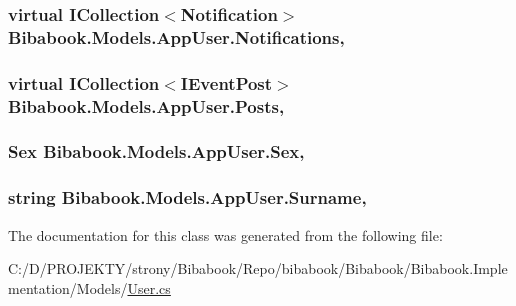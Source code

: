 \subsubsection[{Notifications}]{\setlength{\rightskip}{0pt plus 5cm}virtual I\+Collection$<${\bf Notification}$>$ Bibabook.\+Models.\+App\+User.\+Notifications\hspace{0.3cm}{\ttfamily [get]}, {\ttfamily [set]}}\label{class_bibabook_1_1_models_1_1_app_user_ae6b3d722c91df8dca88d2559d52ea6f4}
\hypertarget{class_bibabook_1_1_models_1_1_app_user_a84be3b79076df57e90c2f46086ba16d7}{}
\subsubsection[{Posts}]{\setlength{\rightskip}{0pt plus 5cm}virtual I\+Collection$<$I\+Event\+Post$>$ Bibabook.\+Models.\+App\+User.\+Posts\hspace{0.3cm}{\ttfamily [get]}, {\ttfamily [set]}}\label{class_bibabook_1_1_models_1_1_app_user_a84be3b79076df57e90c2f46086ba16d7}
\hypertarget{class_bibabook_1_1_models_1_1_app_user_a2130ea655fc647a8331fe0d17bc48808}{}
\subsubsection[{Sex}]{\setlength{\rightskip}{0pt plus 5cm}Sex Bibabook.\+Models.\+App\+User.\+Sex\hspace{0.3cm}{\ttfamily [get]}, {\ttfamily [set]}}\label{class_bibabook_1_1_models_1_1_app_user_a2130ea655fc647a8331fe0d17bc48808}
\hypertarget{class_bibabook_1_1_models_1_1_app_user_aac165e3467b1c5ac86c5c4972107f952}{}
\subsubsection[{Surname}]{\setlength{\rightskip}{0pt plus 5cm}string Bibabook.\+Models.\+App\+User.\+Surname\hspace{0.3cm}{\ttfamily [get]}, {\ttfamily [set]}}\label{class_bibabook_1_1_models_1_1_app_user_aac165e3467b1c5ac86c5c4972107f952}


The documentation for this class was generated from the following file\+:\begin{DoxyCompactItemize}
\item 
C\+:/\+D/\+P\+R\+O\+J\+E\+K\+T\+Y/strony/\+Bibabook/\+Repo/bibabook/\+Bibabook/\+Bibabook.\+Implementation/\+Models/\hyperlink{_user_8cs}{User.\+cs}\end{DoxyCompactItemize}
